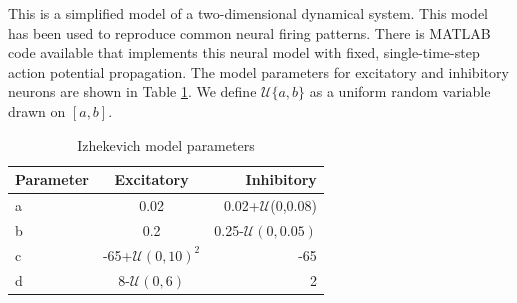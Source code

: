 \documentclass[a4paper,11pt]{article}
\begin{document}
This is a simplified model of a two-dimensional dynamical system.
This model has been used to reproduce common neural firing patterns.
There is MATLAB code available \cite{izzy_code} that implements this neural model with fixed, single-time-step action potential propagation.
The model parameters for excitatory and inhibitory neurons are shown in Table \ref{tab:izzy_params}.
We define $\mathcal{U}\{a,b \}$ as a uniform random variable drawn on $[ a,b ] $.
\begin{table}[!h]
 \caption{Izhekevich model parameters}
 \label{tab:izzy_params}
 \centering
 \begin{tabular}{l|c|r}
  \textbf{Parameter} & \textbf{Excitatory} & \textbf{Inhibitory} \\
  \hline
  a & 0.02 & 0.02+$\mathcal{U}$(0,0.08) \\
  b & 0.2 & 0.25-$\mathcal{U}(0,0.05)$\\
  c & -65+$\mathcal{U}(0,10)^2$ & -65 \\
  d & 8-$\mathcal{U}(0,6)$& 2 \\
 \end{tabular}

\end{table}
\end{document}
